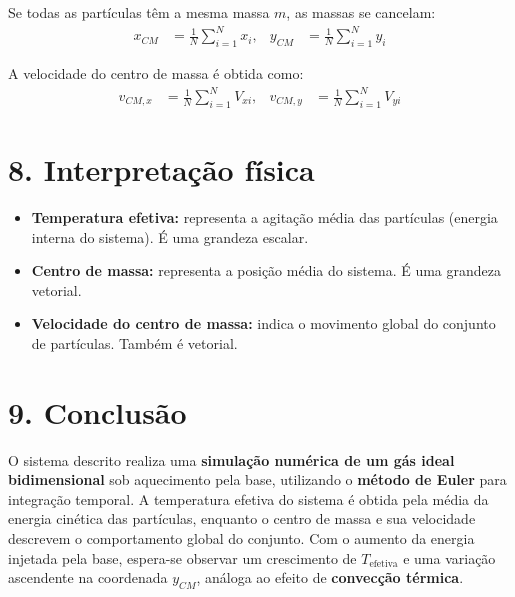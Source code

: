 \documentclass[12pt,a4paper]{article}
\begin{document}
Se todas as partículas têm a mesma massa $m$, as massas se cancelam:
\begin{align}
    x_{CM} &= \frac{1}{N} \sum_{i=1}^{N} x_i, &
    y_{CM} &= \frac{1}{N} \sum_{i=1}^{N} y_i
\end{align}

A velocidade do centro de massa é obtida como:
\begin{align}
    v_{CM,x} &= \frac{1}{N} \sum_{i=1}^{N} V_{xi}, &
    v_{CM,y} &= \frac{1}{N} \sum_{i=1}^{N} V_{yi}
\end{align}

\section*{8. Interpretação física}

\begin{itemize}
    \item \textbf{Temperatura efetiva:} representa a agitação média das partículas (energia interna do sistema). É uma grandeza escalar.
    \item \textbf{Centro de massa:} representa a posição média do sistema. É uma grandeza vetorial.
    \item \textbf{Velocidade do centro de massa:} indica o movimento global do conjunto de partículas. Também é vetorial.
\end{itemize}

\section*{9. Conclusão}

O sistema descrito realiza uma \textbf{simulação numérica de um gás ideal bidimensional} sob aquecimento pela base, utilizando o \textbf{método de Euler} para integração temporal.  
A temperatura efetiva do sistema é obtida pela média da energia cinética das partículas, enquanto o centro de massa e sua velocidade descrevem o comportamento global do conjunto.  
Com o aumento da energia injetada pela base, espera-se observar um crescimento de $T_{\text{efetiva}}$ e uma variação ascendente na coordenada $y_{CM}$, análoga ao efeito de \textbf{convecção térmica}.
\end{document}
